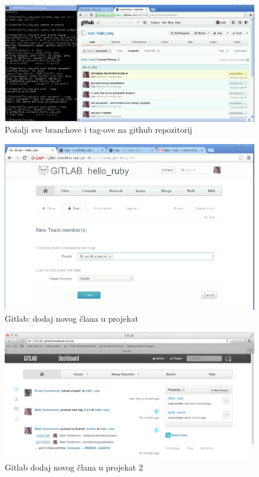 \documentclass[times, utf8, seminar]{fit}
\begin{document}
\begin{figure}[H]
\centering
\includegraphics[width=15cm]{img/github_push_branches_and_tags.png}
\caption{Pošalji sve branchove i tag-ove na github repozitorij}
\end{figure}



\begin{figure}[H]
\centering
\includegraphics[width=15cm]{img/gitlab_add_new_member_to_project.png}
\caption{Gitlab: dodaj novog člana u projekat}
\end{figure}


\begin{figure}[H]
\centering
\includegraphics[width=15cm]{img/gitlab_add_new_member_to_project_2.png}
\caption{Gitlab dodaj novog člana u projekat 2}
\end{figure}
\end{document}
